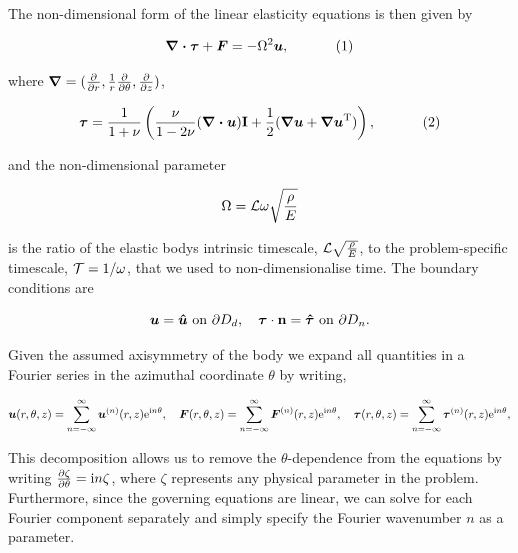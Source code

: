 The non-\/dimensional form of the linear elasticity equations is then given by \begin{center} \[ \mbox{\boldmath$ \nabla\cdot\tau$}+\mbox{\boldmath$ F$}=-\Omega^2\mbox{\boldmath$ u$}, \ \ \ \ \ \ \ \ \ \ (1) \] \end{center}  where $\mbox{\boldmath$ \nabla$}=(\frac{\partial}{\partial r},\frac{1}{r}\frac{\partial}{\partial\theta},\frac{\partial}{\partial z}) $, \begin{center} \[ \mbox{\boldmath$ \tau $}=\frac{1}{1+\nu}\left( \frac{\nu}{1-2\nu}(\mbox{\boldmath$\nabla\cdot u$})\textbf{I}+ \frac{1}{2}(\mbox{\boldmath$ \nabla u$}+\mbox{\boldmath$ \nabla u$}^{{\rm T}})\right), \ \ \ \ \ \ \ \ \ \ (2) \] \end{center}  and the non-\/dimensional parameter \begin{center} \[ \Omega = {\cal L}\omega \sqrt{\frac{\rho}{E}} \] \end{center}  is the ratio of the elastic body\textquotesingle{}s intrinsic timescale, ${\cal L} \sqrt{\frac{\rho}{E}}$, to the problem-\/specific timescale, $ {\cal T}=1/\omega $, that we used to non-\/dimensionalise time. The boundary conditions are \begin{center} \[ \mbox{\boldmath$ u$}=\mbox{\boldmath$ \hat{u}$}\,\,\textrm{on $ \partial D_d $},\quad \mbox{\boldmath$ \tau$}\cdot {\bf n} =\mbox{\boldmath$ \hat{\tau}$}\,\,\textrm{on $ \partial D_n $}.\] \end{center} 

Given the assumed axisymmetry of the body we expand all quantities in a Fourier series in the azimuthal coordinate $ \theta $ by writing, \begin{center} \[ \mbox{\boldmath$ u$}(r,\theta ,z)=\sum_{n=-\infty}^{\infty}\mbox{\boldmath$ u$}^{(n)}(r,z){\rm e}^{{\rm i} n\theta},\quad \mbox{\boldmath$ F$} (r,\theta ,z)=\sum_{n=-\infty}^{\infty}\mbox{\boldmath$ F$}^{(n)}(r,z){\rm e}^{{\rm i} n\theta},\quad \mbox{\boldmath$ \tau$} (r,\theta ,z)=\sum_{n=-\infty}^{\infty}\mbox{\boldmath$ \tau$}^{(n)}(r,z){\rm e}^{{\rm i} n\theta} ,\] \end{center}  This decomposition allows us to remove the $ \theta $-\/dependence from the equations by writing $ \frac{\partial\zeta}{\partial\theta}={\rm i}n\zeta $, where $\zeta $ represents any physical parameter in the problem. Furthermore, since the governing equations are linear, we can solve for each Fourier component separately and simply specify the Fourier wavenumber $ n $ as a parameter.



